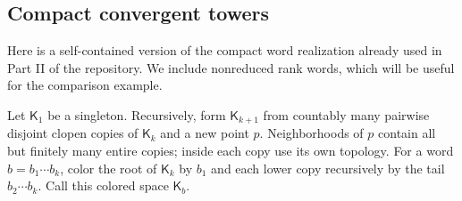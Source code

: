 \documentclass[11pt,letterpaper]{article}
\numberwithin{equation}{section}
\theoremstyle{definition}
\theoremstyle{remark}
\theoremstyle{definition}
\newcommand{\Tw}{\mathsf K}
\begin{document}
\subsection{Compact convergent towers}

Here is a self-contained version of the compact word realization already
used in Part II of the repository. We include nonreduced rank words, which
will be useful for the comparison example.

Let $\Tw_1$ be a singleton. Recursively, form $\Tw_{k+1}$ from countably many
pairwise disjoint clopen copies of $\Tw_k$ and a new point $p$. Neighborhoods
of $p$ contain all but finitely many entire copies; inside each copy use its
own topology. For a word $b=b_1\cdots b_k$, color the root of $\Tw_k$ by $b_1$
and each lower copy recursively by the tail $b_2\cdots b_k$. Call this
colored space $\Tw_b$.
\end{document}
